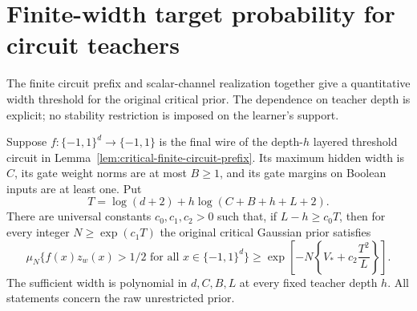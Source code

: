 \section{Finite-width target probability for circuit teachers}
\label{sec:critical-finite-width-circuit-mass}

The finite circuit prefix and scalar-channel realization together give a
quantitative width threshold for the original critical prior.  The
dependence on teacher depth is explicit; no stability restriction is
imposed on the learner's support.

\begin{corollary}
\label{cor:critical-finite-circuit-mass}
Suppose $f:\{-1,1\}^d\to\{-1,1\}$ is the final wire of the
depth-$h$ layered threshold circuit in
Lemma~\ref{lem:critical-finite-circuit-prefix}.  Its maximum hidden
width is $C$, its gate weight norms are at most $B\ge1$, and its
gate margins on Boolean inputs are at least one.  Put
\[
 T=\log(d+2)+h\log(C+B+h+L+2).
\]
There are universal constants $c_0,c_1,c_2>0$ such that, if
$L-h\ge c_0T$, then for every integer $N\ge\exp(c_1T)$ the
original critical Gaussian prior satisfies
\[
 \mu_N\{f(x)z_w(x)>1/2\text{ for all }x\in\{-1,1\}^d\}
 \ge
 \exp\!\left[-N\left\{V_*+c_2\frac{T^2}{L}\right\}\right].
\]
The sufficient width is polynomial in $d,C,B,L$ at every fixed
teacher depth $h$.  All statements concern the raw unrestricted prior.
\end{corollary}

